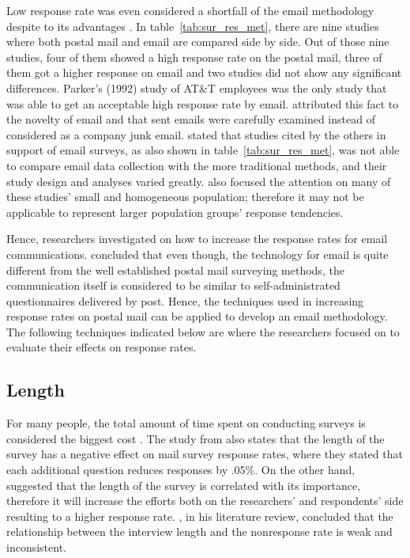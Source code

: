 Low response rate was even considered a shortfall of the email methodology despite to its advantages \citep{BachmannD.ElfrinkJ.&Vazzana1999}. In table~\ref{tab:sur_res_met}, there are nine studies where both postal mail and email are compared side by side. Out of those nine studies, four of them showed a high response rate on the postal mail, three of them got a higher response on email and two studies did not show any significant differences. Parker's (1992) study of AT\&T employees was the only study that was able to get an acceptable high response rate by email. \cite{Schaefer1998} attributed this fact to the novelty of email and that sent emails were carefully examined instead of considered as a company junk email. \cite{Mavis1998} stated that studies cited by the others in support of email surveys, as also shown in table~\ref{tab:sur_res_met}, was not able to compare email data collection with the more traditional methods, and their study design and analyses varied greatly. \cite{Sheehan2006} also focused the attention on many of these studies' small and homogeneous population; therefore it may not be applicable to represent larger population groups' response tendencies.
\vspace{1cm}

Hence, researchers investigated on how to increase the response rates for email communications. \cite{Schaefer1998} concluded that even though, the technology for email is quite different from the well established postal mail surveying methods, the communication itself is considered to be similar to self-administrated questionnaires delivered by post. Hence, the techniques used in increasing response rates on postal mail can be applied to develop an email methodology. The following techniques indicated below are where the researchers focused on to evaluate their effects on response rates.

\subsection{Length}
\label{sec:2.2.1:Leng}
For many people, the total amount of time spent on conducting surveys is considered the biggest cost \citep[page 26]{DillmanDonA.SmythJoleneD.Christian2009}. The study from \cite{Heberlein1978} also states that the length of the survey has a negative effect on mail survey response rates, where they stated that each additional question reduces responses by .05\%. On the other hand, \cite{Bradburn1978} suggested that the length of the survey is correlated with its importance, therefore it will increase the efforts both on the researchers' and respondents' side resulting to a higher response rate. \cite{Bogen1996}, in his literature review, concluded that the relationship between the interview length and the nonresponse rate is weak and inconsistent.

